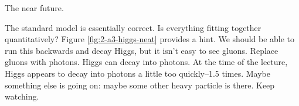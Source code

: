 \documentclass[]{article}
\begin{document}
The near future.

The standard model is essentially correct. Is everything fitting together quantitatively? Figure \ref{fig:2-a3-higgs-neat} provides a hint. We should be able to run this backwards and decay Higgs, but it isn't easy to see gluons. Replace gluons with photons. Higgs can decay into photons. At the time of the lecture, Higgs appears to decay into photons a little too quickly--1.5 times. Maybe something else is going on: maybe some other heavy particle is there. Keep watching. 



\end{document}
